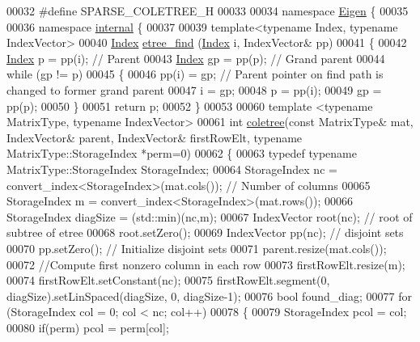 \begin{DoxyCode}
00032 \textcolor{preprocessor}{#define SPARSE\_COLETREE\_H}
00033 
00034 \textcolor{keyword}{namespace }\hyperlink{namespace_eigen}{Eigen} \{
00035 
00036 \textcolor{keyword}{namespace }\hyperlink{namespaceinternal}{internal} \{
00037 
00039 \textcolor{keyword}{template}<\textcolor{keyword}{typename} Index, \textcolor{keyword}{typename} IndexVector>
00040 \hyperlink{namespace_eigen_a62e77e0933482dafde8fe197d9a2cfde}{Index} \hyperlink{namespace_eigen_1_1internal_af1daa938f6414254cc9a754f1ef2490b}{etree\_find} (\hyperlink{namespace_eigen_a62e77e0933482dafde8fe197d9a2cfde}{Index} i, IndexVector& pp)
00041 \{
00042   \hyperlink{namespace_eigen_a62e77e0933482dafde8fe197d9a2cfde}{Index} p = pp(i); \textcolor{comment}{// Parent }
00043   \hyperlink{namespace_eigen_a62e77e0933482dafde8fe197d9a2cfde}{Index} gp = pp(p); \textcolor{comment}{// Grand parent }
00044   \textcolor{keywordflow}{while} (gp != p) 
00045   \{
00046     pp(i) = gp; \textcolor{comment}{// Parent pointer on find path is changed to former grand parent}
00047     i = gp; 
00048     p = pp(i);
00049     gp = pp(p);
00050   \}
00051   \textcolor{keywordflow}{return} p; 
00052 \}
00053 
00060 \textcolor{keyword}{template} <\textcolor{keyword}{typename} MatrixType, \textcolor{keyword}{typename} IndexVector>
00061 \textcolor{keywordtype}{int} \hyperlink{namespace_eigen_1_1internal_a86181db74ba596a7afbfd89efcc5788c}{coletree}(\textcolor{keyword}{const} MatrixType& mat, IndexVector& parent, IndexVector& firstRowElt, \textcolor{keyword}{typename} 
      MatrixType::StorageIndex *perm=0)
00062 \{
00063   \textcolor{keyword}{typedef} \textcolor{keyword}{typename} MatrixType::StorageIndex StorageIndex;
00064   StorageIndex nc = convert\_index<StorageIndex>(mat.cols()); \textcolor{comment}{// Number of columns}
00065   StorageIndex m = convert\_index<StorageIndex>(mat.rows());
00066   StorageIndex diagSize = (std::min)(nc,m);
00067   IndexVector root(nc); \textcolor{comment}{// root of subtree of etree }
00068   root.setZero();
00069   IndexVector pp(nc); \textcolor{comment}{// disjoint sets }
00070   pp.setZero(); \textcolor{comment}{// Initialize disjoint sets }
00071   parent.resize(mat.cols());
00072   \textcolor{comment}{//Compute first nonzero column in each row }
00073   firstRowElt.resize(m);
00074   firstRowElt.setConstant(nc);
00075   firstRowElt.segment(0, diagSize).setLinSpaced(diagSize, 0, diagSize-1);
00076   \textcolor{keywordtype}{bool} found\_diag;
00077   \textcolor{keywordflow}{for} (StorageIndex col = 0; col < nc; col++)
00078   \{
00079     StorageIndex pcol = col;
00080     \textcolor{keywordflow}{if}(perm) pcol  = perm[col];

\end{DoxyCode}
